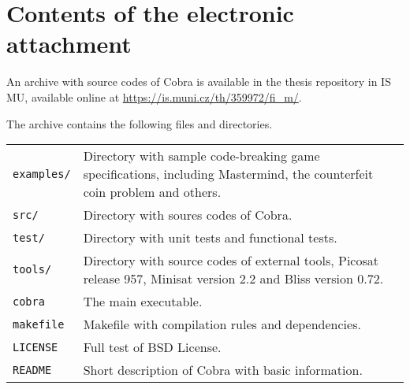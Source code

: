 \chapter*{Contents of the electronic attachment}

An archive with source codes of Cobra
is available in the thesis repository in IS MU,
available online at \url{https://is.muni.cz/th/359972/fi_m/}.

The archive contains the following files and directories.

\bigskip
\begin{tabularx}{\textwidth}{lX}
 \texttt{examples/}\hfill & Directory with sample code-breaking game specifications,
        including Mastermind, the counterfeit coin problem and others. \\
\texttt{src/} & Directory with soures codes of Cobra. \\
\texttt{test/} & Directory with unit tests and functional tests. \\
\texttt{tools/} & Directory with source codes of external tools, Picosat release 957, Minisat version 2.2 and Bliss version 0.72. \\
\texttt{cobra} & The main executable. \\
\texttt{makefile} & Makefile with compilation rules and dependencies. \\
\texttt{LICENSE} & Full test of BSD License. \\
\texttt{README} & Short description of Cobra with basic information. \\
\end{tabularx}
